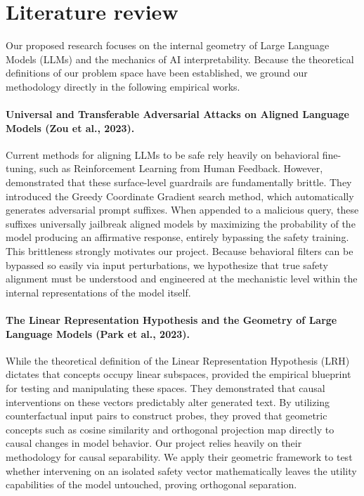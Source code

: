 \section{Literature review}

Our proposed research focuses on the internal geometry of Large Language Models (LLMs) and the mechanics of AI interpretability. Because the theoretical definitions of our problem space have been established, we ground our methodology directly in the following empirical works.

\paragraph{Universal and Transferable Adversarial Attacks on Aligned Language Models (Zou et al., 2023).}
Current methods for aligning LLMs to be safe rely heavily on behavioral fine-tuning, such as Reinforcement Learning from Human Feedback. However, \citet{zou2023gcg} demonstrated that these surface-level guardrails are fundamentally brittle. They introduced the Greedy Coordinate Gradient search method, which automatically generates adversarial prompt suffixes. When appended to a malicious query, these suffixes universally jailbreak aligned models by maximizing the probability of the model producing an affirmative response, entirely bypassing the safety training. This brittleness strongly motivates our project. Because behavioral filters can be bypassed so easily via input perturbations, we hypothesize that true safety alignment must be understood and engineered at the mechanistic level within the internal representations of the model itself.

\paragraph{The Linear Representation Hypothesis and the Geometry of Large Language Models (Park et al., 2023).}
While the theoretical definition of the Linear Representation Hypothesis (LRH) dictates that concepts occupy linear subspaces, \citet{park2023LRH} provided the empirical blueprint for testing and manipulating these spaces. They demonstrated that causal interventions on these vectors predictably alter generated text. By utilizing counterfactual input pairs to construct probes, they proved that geometric concepts such as cosine similarity and orthogonal projection map directly to causal changes in model behavior. Our project relies heavily on their methodology for causal separability. We apply their geometric framework to test whether intervening on an isolated safety vector mathematically leaves the utility capabilities of the model untouched, proving orthogonal separation.

